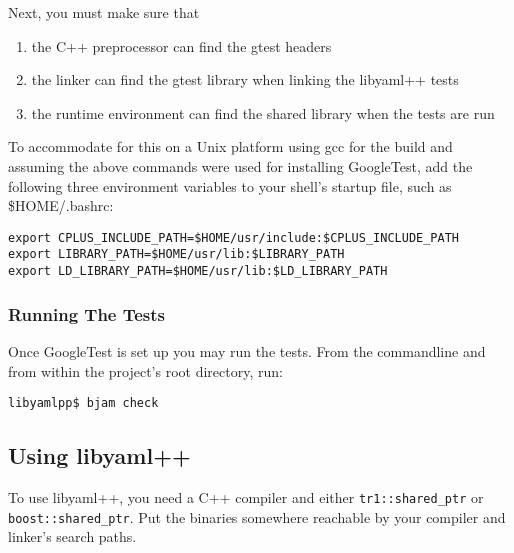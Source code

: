 \documentclass{article}
\begin{document}
Next, you must make sure that

\begin{enumerate}
\item the C++ preprocessor can find the gtest headers
\item the linker can find the gtest library when linking the libyaml++ tests
\item the runtime environment can find the shared library when the tests are run
\end{enumerate}

To accommodate for this on a Unix platform using gcc for the build and assuming
the above commands were used for installing GoogleTest, add the following three
environment variables to your shell's startup file, such as \$HOME/.bashrc:

\begin{verbatim}
export CPLUS_INCLUDE_PATH=$HOME/usr/include:$CPLUS_INCLUDE_PATH
export LIBRARY_PATH=$HOME/usr/lib:$LIBRARY_PATH
export LD_LIBRARY_PATH=$HOME/usr/lib:$LD_LIBRARY_PATH
\end{verbatim}

\subsubsection{Running The Tests}

Once GoogleTest is set up you may run the tests.  From the commandline and from
within the project's root directory, run:

\begin{verbatim}
libyamlpp$ bjam check
\end{verbatim}

\subsection{Using libyaml++}
\label{using_libyamlpp}

To use libyaml++, you need a C++ compiler and either \texttt{tr1::shared\_ptr} or \texttt{boost::shared\_ptr}.  Put the binaries somewhere 
reachable by your compiler and linker's search paths.
\end{document}

